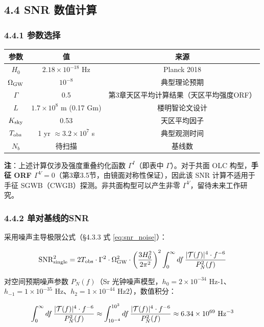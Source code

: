\documentclass[12pt,a4paper]{article}
\begin{document}
\subsection{4.4 SNR 数值计算}


\subsubsection{4.4.1 参数选择}


\begin{tabular}{|c|c|c|}
\hline
参数 & 值 & 来源 \\
\hline
$H_0$ & $2.18 \times 10^{-18}$ Hz & Planck 2018 \\
$\Omega_{\rm GW}$ & $10^{-8}$ & 典型理论预期 \\
$\Gamma$ & 0.5 & 第3章天区平均计算结果（天区平均强度ORF） \\
$L$ & $1.7 \times 10^8$ m (0.17 Gm) & 楼明智论文设计 \\
$K_{\rm sky}$ & 0.53 & 天区平均因子 \\
$T_{\rm obs}$ & 1 yr $\approx 3.2 \times 10^7$ s & 典型观测时间 \\
$N_b$ & 待扫描 & 基线数 \\
\hline
\end{tabular}

\textbf{注}：上述计算仅涉及强度重叠约化函数 $\Gamma^I$（即表中 $\Gamma$）。对于共面 OLC 构型，\textbf{手征 ORF $\Gamma^V = 0$}（第3章3.5节，由镜面对称性保证），因此该 SNR 计算不适用于手征 SGWB（CWGB）探测。非共面构型可以产生非零 $\Gamma^V$，留待未来工作研究。

\subsubsection{4.4.2 单对基线的SNR}


采用噪声主导极限公式（§4.3.3 式 \ref{eq:snr_noise}）：

$${\rm SNR}_{\rm single}^2 = 2 T_{\rm obs} \cdot \Gamma^2 \cdot \Omega_{\rm GW}^2 \cdot \left( \frac{3H_0^2}{2\pi^2} \right)^2 \int_0^\infty df\, \frac{|\mathcal{T}(f)|^4 \cdot f^{-6}}{P_N^2(f)} \label{eq:snr_noise}$$

对空间预期噪声参数 $P_N(f)$（Sr 光钟噪声模型，$h_0=2\times 10^{-34}$ Hz-1、$h_{-1}=1\times 10^{-35}$ Hz、$h_2=1\times 10^{-44}$ Hz2），数值积分：

$$\int_0^\infty df\, \frac{|\mathcal{T}(f)|^4 \cdot f^{-6}}{P_N^2(f)} \approx \int_{10^{-4}}^{10^3} df\, \frac{|\mathcal{T}(f)|^4 \cdot f^{-6}}{P_N^2(f)} \approx 6.34 \times 10^{69} \ {\rm Hz^{-3}}$$
\end{document}
